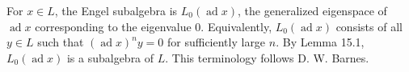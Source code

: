 For $x \in L$, the Engel subalgebra is $L_0(\operatorname{ad} x)$, the generalized eigenspace of $\operatorname{ad} x$ corresponding to the eigenvalue $0$. Equivalently, $L_0(\operatorname{ad} x)$ consists of all $y \in L$ such that $(\operatorname{ad} x)^n y = 0$ for sufficiently large $n$. By Lemma 15.1, $L_0(\operatorname{ad} x)$ is a subalgebra of $L$. This terminology follows D. W. Barnes.
